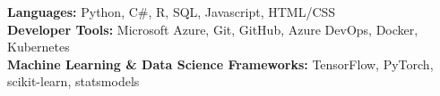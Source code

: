 \begin{itemize}[leftmargin=0.15in, label={}]
    \small{\item{
          \textbf{Languages:} {Python, C\#, R, SQL, Javascript, HTML/CSS} \\
          \textbf{Developer Tools:} {Microsoft Azure, Git, GitHub, Azure DevOps, Docker, Kubernetes} \\
          \textbf{Machine Learning \& Data Science Frameworks:} {TensorFlow, PyTorch, scikit-learn, statsmodels}
          }}
\end{itemize}
